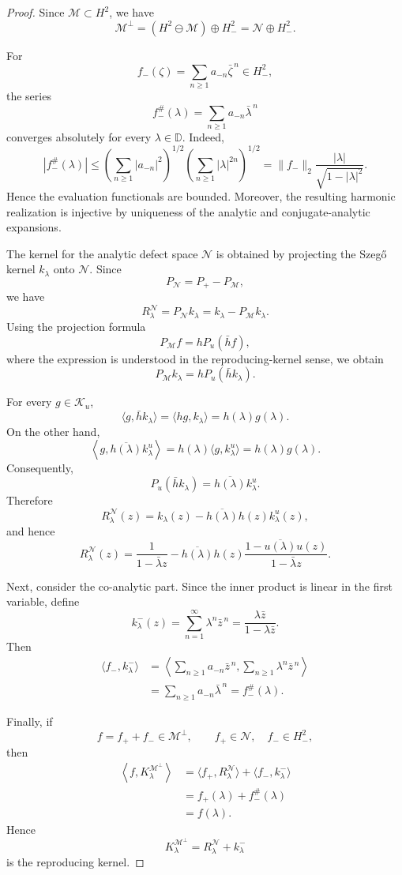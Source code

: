 \documentclass[12pt]{amsart}
\theoremstyle{definition}
\theoremstyle{remark}
\def \D{\mathbb{D}}
\newcommand{\clm}{\mathcal{M}}
\newcommand{\cln}{\mathcal{N}}
\newcommand{\clk}{\mathcal{K}}
\numberwithin{equation}{section}
\begin{document}
\begin{proof}
Since $\clm\subset H^2$, we have
\[
\clm^\perp
=(H^2\ominus\clm)\oplus H_{-}^2
=\cln\oplus H_{-}^2.
\]

For
\[
f_{-}(\zeta)=\sum_{n\geq1}a_{-n}\bar\zeta^{\,n}\in H_{-}^2,
\]
the series
\[
f_{-}^\#(\lambda)
=
\sum_{n\geq1}a_{-n}\bar\lambda^{\,n}
\]
converges absolutely for every $\lambda\in\D$. Indeed,
\[
|f_{-}^\#(\lambda)|
\leq
\left(\sum_{n\geq1}|a_{-n}|^2\right)^{1/2}
\left(\sum_{n\geq1}|\lambda|^{2n}\right)^{1/2}
=
\|f_{-}\|_2
\frac{|\lambda|}{\sqrt{1-|\lambda|^2}}.
\]
Hence the evaluation functionals are bounded. Moreover, the resulting
harmonic realization is injective by uniqueness of the analytic and
conjugate-analytic expansions.

The kernel for the analytic defect space $\cln$ is obtained by projecting
the Szeg\H{o} kernel $k_\lambda$ onto $\cln$. Since
\[
P_\cln=P_+-P_\clm,
\]
we have
\[
R_\lambda^\cln
=
P_\cln k_\lambda
=
k_\lambda-P_\clm k_\lambda.
\]
Using the projection formula
\[
P_\clm f=hP_u(\bar h f),
\]
where the expression is understood in the reproducing-kernel sense, we
obtain
\[
P_\clm k_\lambda
=
hP_u(\bar h k_\lambda).
\]

For every $g\in\clk_u$,
\[
\langle g,\bar h k_\lambda\rangle
=
\langle hg,k_\lambda\rangle
=
h(\lambda)g(\lambda).
\]
On the other hand,
\[
\left\langle
g,\overline{h(\lambda)}k_\lambda^u
\right\rangle
=
h(\lambda)\langle g,k_\lambda^u\rangle
=
h(\lambda)g(\lambda).
\]
Consequently,
\[
P_u(\bar h k_\lambda)
=
\overline{h(\lambda)}k_\lambda^u.
\]
Therefore
\[
R_\lambda^\cln(z)
=
k_\lambda(z)
-
\overline{h(\lambda)}h(z)k_\lambda^u(z),
\]
and hence
\[
R_\lambda^\cln(z)
=
\frac{1}{1-\bar\lambda z}
-
\overline{h(\lambda)}h(z)
\frac{1-\overline{u(\lambda)}u(z)}
     {1-\bar\lambda z}.
\]

Next, consider the co-analytic part. Since the inner product is linear
in the first variable, define
\[
k_\lambda^-(z)
=
\sum_{n=1}^{\infty}\lambda^n\bar z^{\,n}
=
\frac{\lambda\bar z}{1-\lambda\bar z}.
\]
Then
\[
\begin{aligned}
\langle f_{-},k_\lambda^-\rangle
&=
\left\langle
\sum_{n\geq1}a_{-n}\bar z^{\,n},
\sum_{n\geq1}\lambda^n\bar z^{\,n}
\right\rangle  \\
&=
\sum_{n\geq1}a_{-n}\bar\lambda^{\,n}
=
f_{-}^\#(\lambda).
\end{aligned}
\]

Finally, if
\[
f=f_{+}+f_{-}\in\clm^\perp,
\qquad
f_{+}\in\cln,\quad f_{-}\in H_{-}^2,
\]
then
\[
\begin{aligned}
\left\langle f,K_\lambda^{\clm^\perp}\right\rangle
&=
\langle f_{+},R_\lambda^\cln\rangle
+
\langle f_{-},k_\lambda^-\rangle \\
&=
f_{+}(\lambda)+f_{-}^\#(\lambda) \\
&=
f(\lambda).
\end{aligned}
\]
Hence
\[
K_\lambda^{\clm^\perp}
=
R_\lambda^\cln+k_\lambda^-
\]
is the reproducing kernel.
\end{proof}
\end{document}
